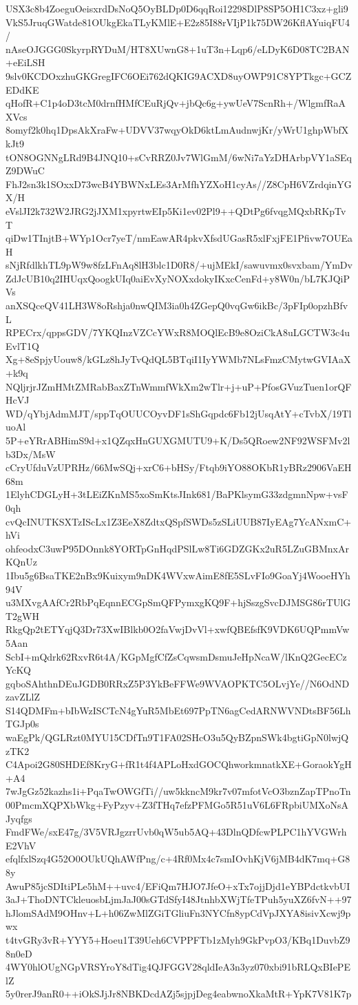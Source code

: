 USX3c8b4ZoeguOeisxrdDsNoQ5OyBLDp0D6qqRoi12298DlP8SP5OH1C3xz+gli9
VkS5JruqGWatde81OUkgEkaTLyKMlE+E2z85I88rVIjP1k75DW26KflAYuiqFU4/
nAseOJGGG0SkyrpRYDuM/HT8XUwnG8+1uT3n+Lqp6/eLDyK6D08TC2BAN+eEiLSH
9slv0KCDOxzhuGKGregIFC6OEi762dQKIG9ACXD8uyOWP91C8YPTkgc+GCZEDdKE
qHofR+C1p4oD3tcM0drnfHMfCEuRjQv+jbQc6g+ywUeV7ScnRh+/WlgmfRaAXVcs
8omyf2k0hq1DpsAkXraFw+UDVV37wqyOkD6ktLmAudnwjKr/yWrU1ghpWbfXkJt9
tON8OGNNgLRd9B4JNQ10+sCvRRZ0Jv7WlGmM/6wNi7aYzDHArbpVY1aSEqZ9DWuC
FhJ2sn3k1SOxxD73wcB4YBWNxLEs3ArMfhYZXoH1cyAs//Z8CpH6VZrdqinYGX/H
eVslJI2k732W2JRG2jJXM1xpyrtwEIp5Ki1ev02Pl9++QDtPg6fvqgMQxbRKpTvT
qiDw1TInjtB+WYp1Ocr7yeT/nmEawAR4pkvXfsdUGasR5xlFxjFE1Pfivw7OUEaH
sNjRfdlkhTL9pW9w8fzLFnAq8lH3blc1D0R8/+ujMEkI/sawuvmx0svxbam/YmDv
ZdJcUB10q2IHUqxQoogkUIq0aiEvXyNOXxdokyIKxcCenFd+y8W0n/bL7KJQiPVs
anXSQceQV41LH3W8oRshja0nwQIM3ia0h4ZGepQ0vqGw6ikBc/3pFIp0opzhBfvL
RPECrx/qppsGDV/7YKQInzVZCcYWxR8MOQlEcB9e8OziCkA8uLGCTW3c4uEvlT1Q
Xg+8eSpjyUouw8/kGLz8hJyTvQdQL5BTqiI1IyYWMb7NLsFmzCMytwGVIAaX+k9q
NQljrjrJZmHMtZMRabBaxZTnWmmfWkXm2wTlr+j+uP+PfosGVuzTuen1orQFHcVJ
WD/qYbjAdmMJT/sppTqOUUCOyvDF1sShGqpdc6Fb12jUsqAtY+cTvbX/19TluoAl
5P+eYRrABHimS9d+x1QZqxHnGUXGMUTU9+K/Ds5QRoew2NF92WSFMv2lb3Dx/MsW
cCryUfduVzUPRHz/66MwSQj+xrC6+bHSy/Ftqb9iYO88OKbR1yBRz2906VaEH68m
1ElyhCDGLyH+3tLEiZKnMS5xoSmKtsJInk681/BaPKlsymG33zdgmnNpw+vsF0qh
cvQcINUTKSXTzIScLx1Z3EeX8ZdtxQSpfSWDs5zSLiUUB87IyEAg7YcANxmC+hVi
ohfeodxC3uwP95DOnnk8YORTpGnHqdPSlLw8Ti6GDZGKx2uR5LZuGBMnxArKQnUz
1Ibu5g6BsaTKE2nBx9Kuixym9nDK4WVxwAimE8fE5SLvFIo9GoaYj4WooeHYh94V
u3MXvgAAfCr2RbPqEqnnECGpSmQFPymxgKQ9F+hjSszgSvcDJMSG86rTUlGT2gWH
RkgQp2tETYqjQ3Dr73XwIBlkb0O2faVwjDvVl+xwfQBEfsfK9VDK6UQPmmVw5Aan
ScbI+mQdrk62RxvR6t4A/KGpMgfCfZsCqwsmDsmuJeHpNcaW/lKnQ2GecECzYcKQ
gqboSAhthnDEuJGDB0RRxZ5P3YkBeFFWe9WVAOPKTC5OLvjYe//N6OdNDzavZLlZ
S14QDMFm+bIbWzISCTcN4gYuR5MbEt697PpTN6agCedARNWVNDtsBF56LhTGJp0s
waEgPk/QGLRzt0MYU15CDfTn9T1FA02SHcO3u5QyBZpnSWk4bgtiGpN0lwjQzTK2
C4Apoi2G80SHDEf8KryG+fR1t4f4APLoHxdGOCQhworkmnatkXE+GoraokYgH+A4
7wJgGz52kazhs1i+PqaTwOWGfTi//uw5kkncM9kr7v07mfotVcO3bznZapTPnoTn
00PmcmXQPXbWkg+FyPzyv+Z3fTHq7efzPFMGo5R51uV6L6FRpbiUMXoNsAJyqfgs
FmdFWe/sxE47g/3V5VRJgzrrUvb0qW5ub5AQ+43DlnQDfcwPLPC1hYVGWrhE2VhV
efqlfxlSzq4G52O0OUkUQhAWfPng/c+4Rf0Mx4c7smIOvhKjV6jMB4dK7mq+G88y
AwuP85jcSDItiPLe5hM++uvc4/EFiQm7HJO7JfeO+xTx7ojjDjd1eYBPdctkvbUI
3aJ+ThoDNTCkleuosbLjmJaJ00sGTdSfyI48JtnhbXWjTfeTPuh5yuXZ6fvN++97
hJlomSAdM9OHnv+L+h06ZwMlZGiTGliuFn3NYCfn8ypCdVpJXYA8isivXcwj9pwx
t4tvGRy3vR+YYY5+Hoeu1T39Ueh6CVPPFTb1zMyh9GkPvpO3/KBq1DuvbZ98n0eD
4WY0hlOUgNGpVRSYroY8dTig4QJFGGV28qldIeA3n3yz070xbi91bRLQxBIePElZ
5y0rerJ9anR0++iOkSJjJr8NBKDcdAZj5sjpjDeg4eabwnoXkaMtR+YpK7V81K7p

